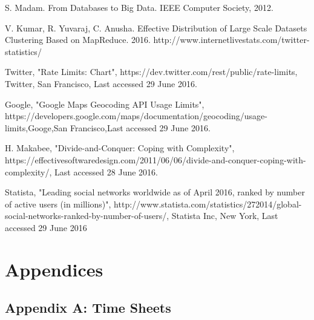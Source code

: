 \documentclass[12pt]{article} %
\begin{document}
	\begin{thebibliography}{99} %
		
		 S. Madam. From Databases to Big Data. IEEE Computer Society, 2012.
	
		
		 V. Kumar, R. Yuvaraj, C. Anusha. Effective Distribution of Large Scale Datasets Clustering Based on MapReduce. 2016.
		 http://www.internetlivestats.com/twitter-statistics/
		
		 Twitter, "Rate Limits: Chart", https://dev.twitter.com/rest/public/rate-limits, Twitter, San Francisco, Last accessed 29 June 2016.
		
		 Google, "Google Maps Geocoding API Usage Limits", https://developers.google.com/maps/documentation/geocoding/usage-limits,Googe,San Francisco,Last accessed 29 June 2016.
		
		 H. Makabee, "Divide-and-Conquer: Coping with Complexity", https://effectivesoftwaredesign.com/2011/06/06/divide-and-conquer-coping-with-complexity/, Last accessed 28 June 2016.
		
		 Statista, "Leading social networks worldwide as of April 2016, ranked by number of active users (in millions)", 
		http://www.statista.com/statistics/272014/global-social-networks-ranked-by-number-of-users/, Statista Inc, New York, Last accessed 29 June 2016
		
		
		
		

		
	\end{thebibliography}
	\newpage
	
	\section{Appendices}
	
	\subsection{Appendix A: Time Sheets}
	
\end{document}
